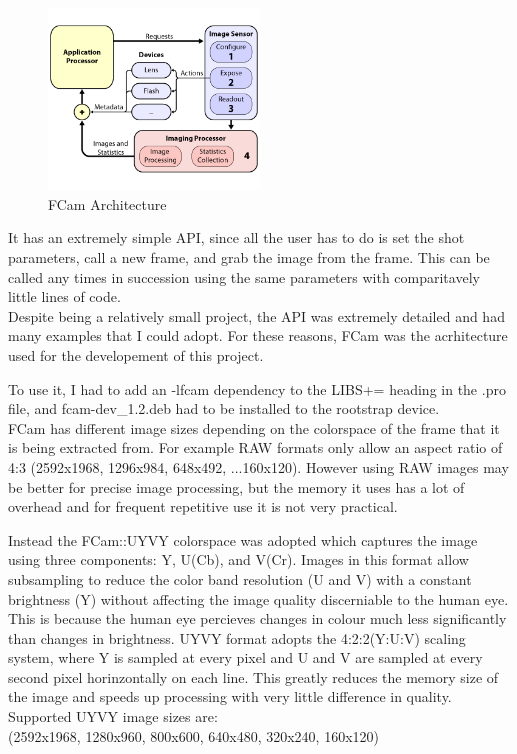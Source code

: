 \documentclass[11pt]{article} %
\begin{document}
\begin{figure}
	\vspace{-40pt}
	\begin{center}
		\includegraphics[width=0.5\textwidth]{../images/fcam_arch}
	\end{center}
	\vspace{-20pt}
	\caption{FCam Architecture}
\end{figure}
It has an extremely simple API, since all the user has to do is set the shot parameters, call a new frame, and grab the image from the frame. This can be called any times in succession using the same parameters with comparitavely little lines of code.\\
Despite being a relatively small project, the API was extremely detailed and had many examples that I could adopt. For these reasons, FCam was the acrhitecture used for the developement of this project.

To use it, I had to add an -lfcam dependency to the LIBS+= heading in the .pro file, and fcam-dev\_1.2.deb had to be installed to the rootstrap device.\\

FCam has different image sizes depending on the colorspace of the frame that it is being extracted from. For example RAW formats only allow an aspect ratio of 4:3 (2592x1968, 1296x984, 648x492, ...160x120). However using RAW images may be better for precise image processing, but the memory it uses has a lot of overhead and for frequent repetitive use it is not very practical.

Instead the FCam::UYVY colorspace was adopted which captures the image using three components: Y, U(Cb), and V(Cr). 
Images in this format allow subsampling to reduce the color band resolution (U and V) with a constant brightness (Y) without affecting the image quality discerniable to the human eye. This is because the human eye percieves changes in colour much less significantly than changes in brightness. UYVY format adopts the 4:2:2(Y:U:V) scaling system, where Y is sampled at every pixel and U and V are sampled at every second pixel horinzontally on each line. This greatly reduces the memory size of the image and speeds up processing with very little difference in quality. Supported UYVY image sizes are:\\ (2592x1968, 1280x960, 800x600, 640x480, 320x240, 160x120)
\end{document}
